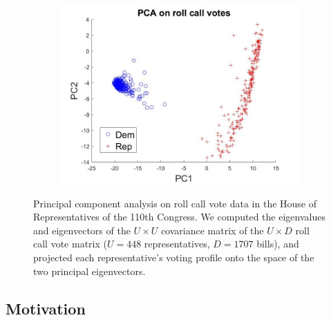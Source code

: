 \documentclass{article}
\begin{document}
\begin{figure}[!h]
  \centering
          \begin{subfigure}[b]{0.5\textwidth}
        \includegraphics[width=\textwidth]{PCA_votes}
    \end{subfigure}
  \caption{Principal component analysis on roll call vote data in the House of Representatives of the 110th Congress. We computed the eigenvalues and eigenvectors of the $U\times U$ covariance matrix of the $U\times D$ roll call vote matrix ($U = 448$ representatives, $D = 1707$ bills), and projected each representative's voting profile onto the space of the two principal eigenvectors.}

  \label{fig:DimRedux}
\end{figure}

\subsection{Motivation} 
\end{document}
